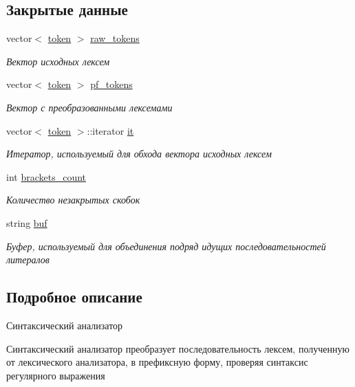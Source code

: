 \subsection*{Закрытые данные}
\begin{DoxyCompactItemize}
\item 
vector$<$ \hyperlink{structtoken}{token} $>$ \hyperlink{class_syntax_analyzer_aea5a27bee70623ed8bf91972938d39af}{raw\+\_\+tokens}
\begin{DoxyCompactList}\small\item\em Вектор исходных лексем \end{DoxyCompactList}\item 
vector$<$ \hyperlink{structtoken}{token} $>$ \hyperlink{class_syntax_analyzer_aadc7ff59a663670756f4ab5e81f7d99a}{pf\+\_\+tokens}
\begin{DoxyCompactList}\small\item\em Вектор с преобразованными лексемами \end{DoxyCompactList}\item 
vector$<$ \hyperlink{structtoken}{token} $>$\+::iterator \hyperlink{class_syntax_analyzer_a38e0d3b67ddaa431c1b200f2ad383e61}{it}
\begin{DoxyCompactList}\small\item\em Итератор, используемый для обхода вектора исходных лексем \end{DoxyCompactList}\item 
int \hyperlink{class_syntax_analyzer_a9ad8571c7819ba91db174772d3fbfbd9}{brackets\+\_\+count}
\begin{DoxyCompactList}\small\item\em Количество незакрытых скобок \end{DoxyCompactList}\item 
string \hyperlink{class_syntax_analyzer_a5b6fe22c4940c5560de49bebe38768e8}{buf}
\begin{DoxyCompactList}\small\item\em Буфер, используемый для объединения подряд идущих последовательностей литералов \end{DoxyCompactList}\end{DoxyCompactItemize}


\subsection{Подробное описание}
Синтаксический анализатор 

Синтаксический анализатор преобразует последовательность лексем, полученную от лексического анализатора, в префиксную форму, проверяя синтаксис регулярного выражения 

